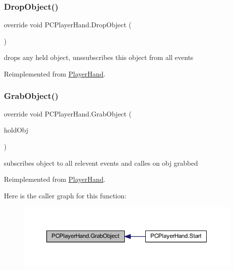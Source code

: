 \subsubsection{\texorpdfstring{Drop\+Object()}{DropObject()}}
{\footnotesize\ttfamily override void P\+C\+Player\+Hand.\+Drop\+Object (\begin{DoxyParamCaption}{ }\end{DoxyParamCaption})\hspace{0.3cm}{\ttfamily [virtual]}}



drops any held object, unssubscribes this object from all events 



Reimplemented from \mbox{\hyperlink{class_player_hand_a3b127b846b420ef37cba3a3a8de68e78}{Player\+Hand}}.

\mbox{\label{class_p_c_player_hand_a08da28b459501727d269733569559c24}} 
\subsubsection{\texorpdfstring{Grab\+Object()}{GrabObject()}}
{\footnotesize\ttfamily override void P\+C\+Player\+Hand.\+Grab\+Object (\begin{DoxyParamCaption}\item[{\mbox{\hyperlink{interface_i_holdable_object}{I\+Holdable\+Object}}}]{hold\+Obj }\end{DoxyParamCaption})\hspace{0.3cm}{\ttfamily [virtual]}}



subscribes object to all relevent events and calles on obj grabbed 



Reimplemented from \mbox{\hyperlink{class_player_hand_a64a86af904a77f4a0b92d72bd5fdf43c}{Player\+Hand}}.

Here is the caller graph for this function\+:\nopagebreak
\begin{figure}[H]
\begin{center}
\leavevmode
\includegraphics[width=350pt]{class_p_c_player_hand_a08da28b459501727d269733569559c24_icgraph}
\end{center}
\end{figure}
\mbox{\label{class_p_c_player_hand_a81d7137403650fb8da125b6356d50496}} 
